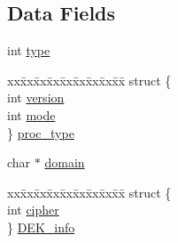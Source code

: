\subsection*{Data Fields}
\begin{DoxyCompactItemize}
\item 
int \hyperlink{structpem__ctx__st_ac765329451135abec74c45e1897abf26}{type}
\item 
\begin{tabbing}
xx\=xx\=xx\=xx\=xx\=xx\=xx\=xx\=xx\=\kill
struct \{\\
\>int \hyperlink{structpem__ctx__st_aad880fc4455c253781e8968f2239d56f}{version}\\
\>int \hyperlink{structpem__ctx__st_a1ea5d0cb93f22f7d0fdf804bd68c3326}{mode}\\
\} \hyperlink{structpem__ctx__st_a6ffc5ee415d17a650f06bcdc135eccb6}{proc\_type}\\

\end{tabbing}\item 
char $\ast$ \hyperlink{structpem__ctx__st_aae647c985f1aaf1f2918a3e1d07635fc}{domain}
\item 
\begin{tabbing}
xx\=xx\=xx\=xx\=xx\=xx\=xx\=xx\=xx\=\kill
struct \{\\
\>int \hyperlink{structpem__ctx__st_aa66cc9b6b16f917a5c9f7597cf6e427a}{cipher}\\
\} \hyperlink{structpem__ctx__st_a56c7a83c3185f68528bb730c36458d58}{DEK\_info}\\


\end{tabbing}
\end{DoxyCompactItemize}
